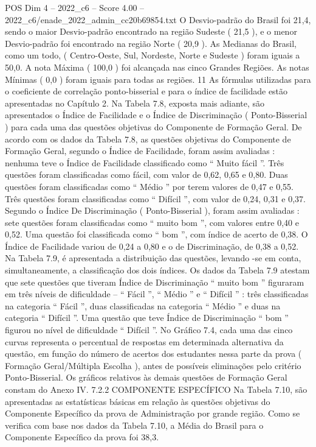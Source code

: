 \begin{textsample}{POS Dim 4 – 2022\_c6 – Score 4.00 – 2022\_c6/enade\_2022\_admin\_cc20b69854.txt}
O Desvio-padrão do Brasil foi 21,4, sendo o maior Desvio-padrão encontrado na região Sudeste ( 21,5 ), e o menor Desvio-padrão foi encontrado na região Norte ( 20,9 ).
As Medianas do Brasil, como um todo, ( Centro-Oeste, Sul, Nordeste, Norte e Sudeste ) foram iguais a 50,0.
A nota Máxima ( 100,0 ) foi alcançada nas cinco Grandes Regiões.
As notas Mínimas ( 0,0 ) foram iguais para todas as regiões. 11 As fórmulas utilizadas para o coeficiente de correlação ponto-bisserial e para o índice de facilidade estão apresentadas no Capítulo 2.
Na Tabela 7.8, exposta mais adiante, são apresentados o Índice de Facilidade e o Índice de Discriminação ( Ponto-Bisserial ) para cada uma das questões objetivas do Componente de Formação Geral.
De acordo com os dados da Tabela 7.8, as questões objetivas do Componente de Formação Geral, segundo o Índice de Facilidade, foram assim avaliadas : nenhuma teve o Índice de Facilidade classificado como “ Muito fácil ”.
Três questões foram classificadas como fácil, com valor de 0,62, 0,65 e 0,80.
Duas questões foram classificadas como “ Médio ” por terem valores de 0,47 e 0,55.
Três questões foram classificadas como “ Difícil ”, com valor de 0,24, 0,31 e 0,37.
Segundo o Índice De Discriminação ( Ponto-Bisserial ), foram assim avaliadas : sete questões foram classificadas como “ muito bom ”, com valores entre 0,40 e 0,52.
Uma questão foi classificada como “ bom ”, com índice de acerto de 0,38.
O Índice de Facilidade variou de 0,24 a 0,80 e o de Discriminação, de 0,38 a 0,52.
Na Tabela 7.9, é apresentada a distribuição das questões, levando -se em conta, simultaneamente, a classificação dos dois índices.
Os dados da Tabela 7.9 atestam que sete questões que tiveram Índice de Discriminação “ muito bom ” figuraram em três níveis de dificuldade – “ Fácil ”, “ Médio ” e “ Difícil ” : três classificadas na categoria “ Fácil ”, duas classificadas na categoria “ Médio ” e duas na categoria “ Difícil ”.
Uma questão que teve Índice de Discriminação “ bom ” figurou no nível de dificuldade “ Difícil ”.
No Gráfico 7.4, cada uma das cinco curvas representa o percentual de respostas em determinada alternativa da questão, em função do número de acertos dos estudantes nessa parte da prova ( Formação Geral/Múltipla Escolha ), antes de possíveis eliminações pelo critério Ponto-Bisserial.
Os gráficos relativos às demais questões de Formação Geral constam do Anexo IV. 7.2.2 COMPONENTE ESPECÍFICO Na Tabela 7.10, são apresentadas as estatísticas básicas em relação às questões objetivas do Componente Específico da prova de Administração por grande região.
Como se verifica com base nos dados da Tabela 7.10, a Média do Brasil para o Componente Específico da prova foi 38,3.

\end{textsample}
